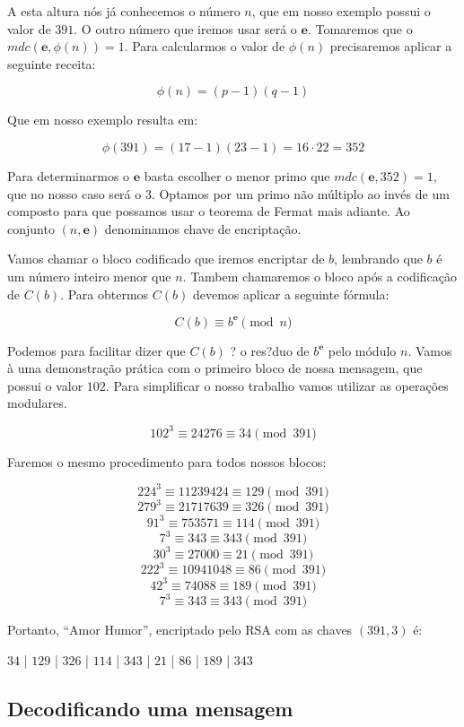 A esta altura n\'os j\'a conhecemos o n\'umero $n$, que em nosso exemplo possui o valor de $391$. O outro n\'umero que iremos usar ser\'a o $\textbf{e}$. Tomaremos que o $mdc(\textbf{e}, \phi(n)) = 1$. Para calcularmos o valor de $\phi(n)$ precisaremos aplicar a seguinte receita:

$$\phi(n) = (p-1)(q-1)$$

Que em nosso exemplo resulta em:

$$\phi(391) = (17 - 1)(23 - 1) = 16 \cdot 22 = 352$$

Para determinarmos o $\textbf{e}$ basta escolher o menor primo que $mdc(\textbf{e}, 352) = 1$, que no nosso caso ser\'a o $3$. Optamos por um primo n\~ao m\'ultiplo ao inv\'es de um composto para que possamos usar o teorema de Fermat mais adiante. Ao conjunto $(n, \textbf{e} )$ denominamos chave de encripta\c{c}\~ao.

Vamos chamar o bloco codificado que iremos encriptar de $b$, lembrando que $b$ \'e um n\'umero inteiro menor que $n$. Tambem chamaremos o bloco ap\'os a codifica\c{c}\~ao de $C(b)$. Para obtermos $C(b)$ devemos aplicar a seguinte f\'ormula:

$$C(b) \equiv b^\textbf{e} \pmod{n} $$

Podemos para facilitar dizer que $C(b)$ ? o res?duo de $b^\textbf{e}$ pelo m\'odulo $n$. Vamos \`a uma demonstra\c{c}\~ao pr\'atica com o primeiro bloco de nossa mensagem, que possui o valor $102$. Para simplificar o nosso trabalho vamos utilizar as opera\c{c}\~oes modulares.

$$102^3 \equiv 24276 \equiv 34 \pmod{391}$$

Faremos o mesmo procedimento para todos nossos blocos:

$$224^3 \equiv 11239424 \equiv 129 \pmod{391} $$
$$279^3 \equiv 21717639 \equiv 326 \pmod{391} $$
$$91^3  \equiv 753571   \equiv 114 \pmod{391} $$
$$7^3   \equiv 343      \equiv 343 \pmod{391} $$
$$30^3  \equiv 27000    \equiv 21  \pmod{391} $$
$$222^3 \equiv 10941048 \equiv 86  \pmod{391} $$
$$42^3  \equiv 74088    \equiv 189 \pmod{391} $$
$$7^3   \equiv 343      \equiv 343 \pmod{391} $$

Portanto, ``Amor Humor'', encriptado pelo RSA com as chaves $(391 , 3)$ \'e: 

\begin{center}
	 $34$ | $129$ | $326$ | $114$ | $343$ | $21$ | $86$ | $189$ | $343$
\end{center}

\subsection{Decodificando uma mensagem}

